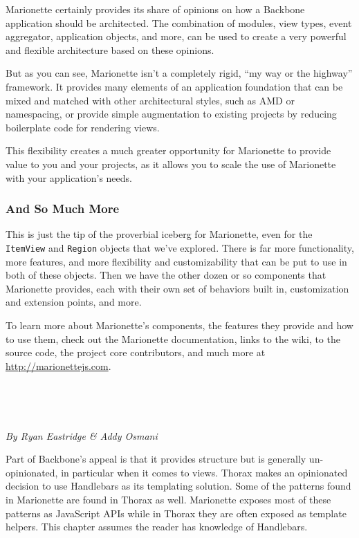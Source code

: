 \documentclass[9pt]{book}
\begin{document}
Marionette certainly provides its share of opinions on how a Backbone
application should be architected. The combination of modules, view
types, event aggregator, application objects, and more, can be used to
create a very powerful and flexible architecture based on these
opinions.

But as you can see, Marionette isn't a completely rigid, ``my way or the
highway'' framework. It provides many elements of an application
foundation that can be mixed and matched with other architectural
styles, such as AMD or namespacing, or provide simple augmentation to
existing projects by reducing boilerplate code for rendering views.

This flexibility creates a much greater opportunity for Marionette to
provide value to you and your projects, as it allows you to scale the
use of Marionette with your application's needs.

\subsubsection{And So Much More}\label{and-so-much-more}

This is just the tip of the proverbial iceberg for Marionette, even for
the \texttt{ItemView} and \texttt{Region} objects that we've explored.
There is far more functionality, more features, and more flexibility and
customizability that can be put to use in both of these objects. Then we
have the other dozen or so components that Marionette provides, each
with their own set of behaviors built in, customization and extension
points, and more.

To learn more about Marionette's components, the features they provide
and how to use them, check out the Marionette documentation, links to
the wiki, to the source code, the project core contributors, and much
more at \url{http://marionettejs.com}.

~

~


\emph{By Ryan Eastridge \& Addy Osmani}

Part of Backbone's appeal is that it provides structure but is generally
un-opinionated, in particular when it comes to views. Thorax makes an
opinionated decision to use Handlebars as its templating solution. Some
of the patterns found in Marionette are found in Thorax as well.
Marionette exposes most of these patterns as JavaScript APIs while in
Thorax they are often exposed as template helpers. This chapter assumes
the reader has knowledge of Handlebars.
\end{document}
